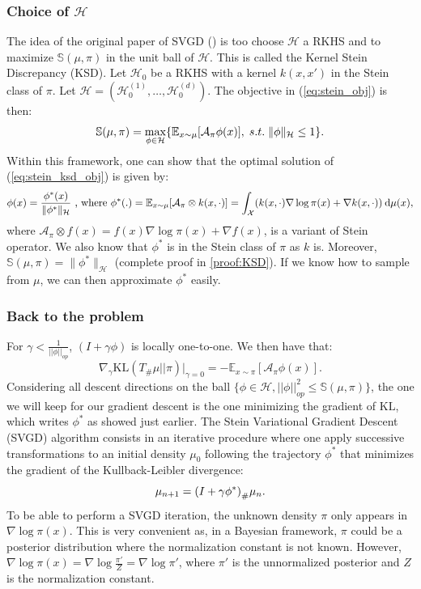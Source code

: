 \documentclass{article}
\newcommand{\E}{\mathbb{E}}
\renewcommand{\S}{\mathbb{S}}
\newcommand{\X}{\mathcal{X}}
\newcommand{\A}{\mathcal{A}}
\newcommand{\KL}{\mathrm{KL}}
\renewcommand{\H}{\mathcal{H}}
\renewcommand{\S}{\mathbb{S}}
\renewcommand{\d}{\: \mathrm{d}}
\DeclarePairedDelimiter{\pare}{(}{)}
\DeclarePairedDelimiter{\bra}{\{}{\}}
\DeclarePairedDelimiter{\sq}{[}{]}
\begin{document}
\subsubsection{Choice of $\H$}\label{sec:RKHS}
The idea of the original paper of SVGD (\cite{Original-SVGD}) is too choose $\H$ a RKHS and
to maximize $\S(\mu, \pi)$ in the unit ball of $\H$. This is called the Kernel Stein Discrepancy (KSD). \newline
Let $\H_0$ be a RKHS with a kernel $k(x, x')$ in the Stein class of $\pi$.
Let $\H = (\H^{(1)}_0, \dots, \H^{(d)}_0)$.
The objective in (\ref{eq:stein_obj}) is then:
\begin{equation}
  \S(\mu, \pi) =
    \max_{\phi \in \H} \bra*{ \E_{x \sim \mu}[\A_\pi \phi (x)], \; s.t. \; \|\phi\|_{\H} \leq 1 }.
  \label{eq:stein_ksd_obj}
\end{equation}
Within this framework, one can show that the optimal solution of (\ref{eq:stein_ksd_obj})
is given by:
\begin{equation}
  \phi(x) = \frac{\phi^*(x)}{\|\phi^*\|_{\H}}
    \text{ , where } \phi^*(.) = \E_{x \sim \mu}\sq*{ \A_\pi \otimes k(x, \cdot) }
                               = \int_\X (k(x, \cdot) \nabla \log \pi(x) + \nabla k(x, \cdot)) \d \mu(x),
  \label{eq:stein_ksd_sol}        
\end{equation}
where $\A_\pi \otimes f(x) =  f(x) \nabla \log \pi(x) + \nabla f(x)$, is a variant of Stein operator. We also know that $\phi^*$ is in the Stein class of $\pi$ as $k$ is.
Moreover, $\S(\mu, \pi) = \|\phi^*\|_\H$ (complete proof in \ref{proof:KSD}).
If we know how to sample from $\mu$, we can then approximate $\phi^*$ easily.
\subsubsection{Back to the problem}
For $\gamma < \frac{1}{||\phi||_{op}}$, $(I+\gamma \phi)$ is locally one-to-one. We then have that: $$\nabla_\gamma \KL(T_\#\mu||\pi)|_{\gamma = 0} = - \E_{x\sim \pi}[\A_\pi \phi(x)].$$ 
Considering all descent directions on the ball $\{\phi\in \H, ||\phi||^2_{op} \leq \S(\mu,\pi)\}$, the one we will keep for our gradient descent is the one minimizing the gradient of $\KL$, which writes $\phi^*$ as showed just earlier. \newline
The Stein Variational Gradient Descent (SVGD) algorithm consists
in an iterative procedure where one apply successive transformations
to an initial density $\mu_0$ following
the trajectory $\phi^*$ that minimizes the gradient of the Kullback-Leibler divergence:
\begin{equation}
  \mu_{n+1} = \pare*{ I + \gamma \phi^* }_\# \mu_n.
  \label{eq:mu-n}
\end{equation}
To be able to perform a SVGD iteration, the unknown density $\pi$ only appears
in $\nabla \log \pi(x)$. This is very convenient as, in a Bayesian framework,
$\pi$ could be a posterior distribution where the normalization constant is not known.
However, $\nabla \log \pi(x) = \nabla \log \frac{\pi'}{Z} = \nabla \log \pi'$,
where $\pi'$ is the unnormalized posterior and $Z$ is the normalization constant.
\end{document}
